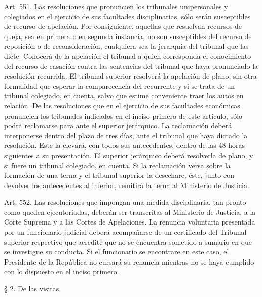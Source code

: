     Art. 551. Las resoluciones que pronuncien los tribunales unipersonales y colegiados en el ejercicio de sus facultades disciplinarias, sólo serán susceptibles de recurso de apelación. Por consiguiente, aquellas que resuelvan recursos de queja, sea en primera o en segunda instancia, no son susceptibles del recurso de reposición o de reconsideración, cualquiera sea la jerarquía del tribunal que las dicte.
    Conocerá de la apelación el tribunal a quien corresponda el conocimiento del recurso de casación contra las sentencias del tribunal que haya pronunciado la resolución recurrida.
    El tribunal superior resolverá la apelación de plano, sin otra formalidad que esperar la comparecencia del recurrente y si se trata de un tribunal colegiado, en cuenta, salvo que estime conveniente traer los autos en relación.
    De las resoluciones que en el ejercicio de sus facultades económicas pronuncien los tribunales indicados en el inciso primero de este artículo, sólo podrá reclamarse para ante el superior jerárquico. La reclamación deberá interponerse dentro del plazo de tres días, ante el tribunal que haya dictado la resolución. Este la elevará, con todos sus antecedentes, dentro de las 48 horas siguientes a su presentación.
    El superior jerárquico deberá resolverla de plano, y si fuere un tribunal colegiado, en cuenta.
    Si la reclamación versa sobre la formación de una terna y el tribunal superior la desechare, éste, junto con devolver los antecedentes al inferior, remitirá la terna al Ministerio de Justicia.


    Art. 552. Las resoluciones que impongan una medida disciplinaria, tan pronto como queden ejecutoriadas, deberán ser transcritas al Ministerio de Justicia, a la Corte Suprema y a las Cortes de Apelaciones.
    La renuncia voluntaria presentada por un funcionario judicial deberá acompañarse de un certificado del Tribunal superior respectivo que acredite que no se encuentra sometido a sumario en que se investigue su conducta. Si el funcionario se encontrare en este caso, el Presidente de la República no cursará su renuncia mientras no se haya cumplido con lo dispuesto en el inciso primero.



    § 2. De las visitas


